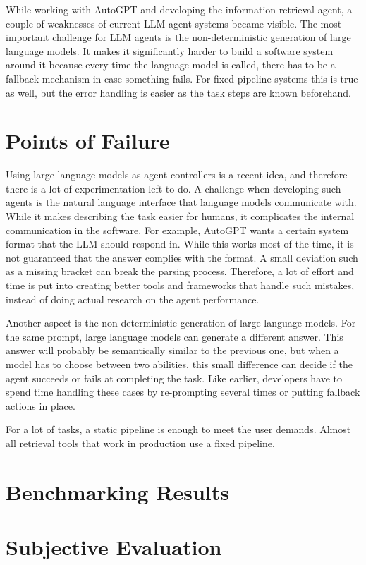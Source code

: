 \documentclass[../main.tex]{subfiles}
\begin{document}
While working with AutoGPT and developing the information retrieval agent,
a couple of weaknesses of current LLM agent systems became visible.
The most important challenge for LLM agents is the non-deterministic generation of large language models.
It makes it significantly harder to build a software system around it because every time the language model is called,
there has to be a fallback mechanism in case something fails.
For fixed pipeline systems this is true as well,
but the error handling is easier as the task steps are known beforehand.

\section{Points of Failure}

Using large language models as agent controllers is a recent idea, and therefore there is a lot of experimentation left to do.
A challenge when developing such agents is the natural language interface that language models communicate with.
While it makes describing the task easier for humans, it complicates the internal communication in the software.
For example, AutoGPT wants a certain system format that the LLM should respond in.
While this works most of the time, it is not guaranteed that the answer complies with the format.
A small deviation such as a missing bracket can break the parsing process.
Therefore, a lot of effort and time is put into creating better tools and frameworks that handle such mistakes,
instead of doing actual research on the agent performance.

Another aspect is the non-deterministic generation of large language models. %
For the same prompt, large language models can generate a different answer.
This answer will probably be semantically similar to the previous one,
but when a model has to choose between two abilities,
this small difference can decide if the agent succeeds or fails at completing the task.
Like earlier, developers have to spend time handling these cases by re-prompting several times or putting fallback actions in place.

For a lot of tasks, a static pipeline is enough to meet the user demands.
Almost all retrieval tools that work in production use a fixed pipeline.

\section{Benchmarking Results}

\section{Subjective Evaluation}
\end{document}

